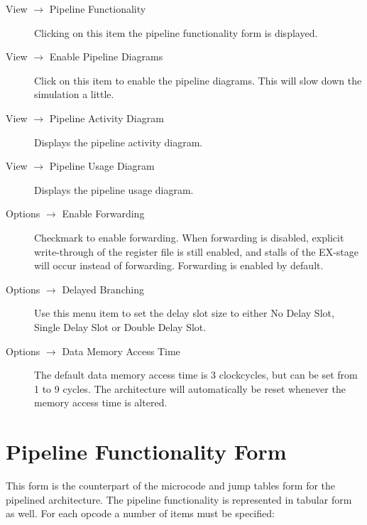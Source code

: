 \documentclass{article}
\begin{document}
\begin{description}
\item[View $\to$ Pipeline Functionality] Clicking on this item the pipeline functionality form is displayed.
\item[View $\to$ Enable Pipeline Diagrams] Click on this item to enable the pipeline diagrams. This will slow down the simulation a little.
\item[View $\to$ Pipeline Activity Diagram] Displays the pipeline activity diagram.
\item[View $\to$ Pipeline Usage Diagram] Displays the pipeline usage diagram.
\item[Options $\to$ Enable Forwarding] Checkmark to 
enable forwarding. When forwarding is disabled, explicit write-through 
of the register file is still enabled, and stalls of the EX-stage will 
occur instead of forwarding. Forwarding is enabled by default.
\item[Options $\to$ Delayed Branching] Use this menu item to set the delay slot size to either No Delay Slot, Single Delay Slot or Double Delay Slot.
\item[Options $\to$ Data Memory Access Time] The 
default data memory access time is 3 clockcycles, but can be set from 1 
to 9 cycles. The architecture will automatically be reset whenever the 
memory access time is altered.
\end{description}

\section{Pipeline Functionality Form}
This form is the counterpart of the microcode and jump tables form for 
the pipelined architecture. The pipeline functionality is represented in
 tabular form as well. For each opcode a number of items must be 
specified:
\end{document}
